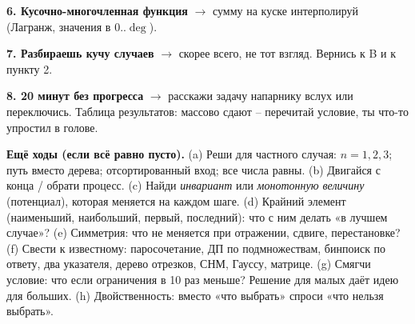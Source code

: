 \par \textbf{6. Кусочно-многочленная функция} $\to$ сумму на куске интерполируй (Лагранж, значения в $0..\deg$).
\par \textbf{7. Разбираешь кучу случаев} $\to$ скорее всего, не тот взгляд. Вернись к B и к пункту 2.
\par \textbf{8. 20 минут без прогресса} $\to$ расскажи задачу напарнику вслух или переключись. Таблица результатов: массово сдают -- перечитай условие, ты что-то упростил в голове.
\par \textbf{Ещё ходы (если всё равно пусто).} (a) Реши для частного случая: $n=1,2,3$; путь вместо дерева; отсортированный вход; все числа равны. (b) Двигайся с конца / обрати процесс. (c) Найди \emph{инвариант} или \emph{монотонную величину} (потенциал), которая меняется на каждом шаге. (d) Крайний элемент (наименьший, наибольший, первый, последний): что с ним делать «в лучшем случае»? (e) Симметрия: что не меняется при отражении, сдвиге, перестановке? (f) Свести к известному: паросочетание, ДП по подмножествам, бинпоиск по ответу, два указателя, дерево отрезков, СНМ, Гауссу, матрице. (g) Смягчи условие: что если ограничения в 10 раз меньше? Решение для малых даёт идею для больших. (h) Двойственность: вместо «что выбрать» спроси «что нельзя выбрать».
